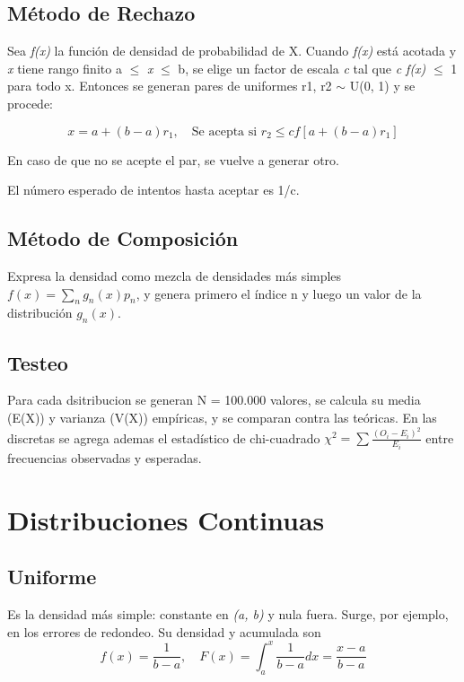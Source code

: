 \documentclass{article}
\begin{document}
\subsection{Método de Rechazo}
Sea \textit{f(x)} la función de densidad de probabilidad de X.
Cuando \textit{f(x)} está acotada y \textit{x} tiene rango finito a $\leq$ \textit{x} $\leq$  b, se elige un factor de escala \textit{c} tal que \textit{c f(x)} $\leq$ 1 para todo x.
Entonces se generan pares de uniformes r1, r2 $\sim$ U(0, 1) y se procede:

\begin{equation}
x = a + (b-a)r_1, \quad \text{Se acepta si } r_2 \leq cf[a+(b-a)r_1]
\end{equation}

En caso de que no se acepte el par, se vuelve a generar otro.

El número esperado de intentos hasta aceptar es 1/c.


\subsection{Método de Composición}
Expresa la densidad como mezcla de densidades más simples $f(x) = \sum_{n} g_n(x)p_n$, y genera primero el índice n y luego un valor de la distribución $g_n(x)$.

\subsection{Testeo}
Para cada dsitribucion se generan N = 100.000 valores, se calcula su media (E(X)) y varianza (V(X)) empíricas, y se comparan contra las teóricas.
En las discretas se agrega ademas el estadístico de chi-cuadrado $\chi^2=\sum \frac{(O_i - E_i)^2}{E_i}$ entre frecuencias observadas y esperadas.


\section{Distribuciones Continuas}


\subsection{Uniforme}
Es la densidad más simple: constante en \textit{(a, b)} y nula fuera. Surge, por ejemplo, en los errores de redondeo. Su densidad y acumulada son
\begin{equation}
f(x) = \frac{1}{b-a}, \quad F(x) = \int_{a}^{x} \frac{1}{b-a} dx = \frac{x-a}{b-a}
\end{equation}
\end{document}
